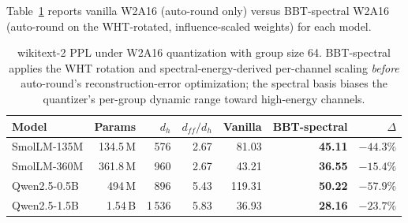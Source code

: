 \documentclass[11pt]{article}
\begin{document}
Table~\ref{tab:llm_quant} reports vanilla W2A16 (auto-round only) versus BBT-spectral W2A16 (auto-round on the WHT-rotated, influence-scaled weights) for each model.

\begin{table}[t]
\centering
\small
\caption{wikitext-2 PPL under W2A16 quantization with group size 64. BBT-spectral applies the WHT rotation and spectral-energy-derived per-channel scaling \emph{before} auto-round's reconstruction-error optimization; the spectral basis biases the quantizer's per-group dynamic range toward high-energy channels.}
\label{tab:llm_quant}
\begin{tabular}{lrrrrrr}
\toprule
\textbf{Model} & Params & $d_h$ & $d_{ff}/d_h$ & Vanilla & BBT-spectral & $\Delta$ \\
\midrule
SmolLM-135M & 134.5\,M & 576 & 2.67 & 81.03 & \textbf{45.11} & $-44.3\%$ \\
SmolLM-360M & 361.8\,M & 960 & 2.67 & 43.21 & \textbf{36.55} & $-15.4\%$ \\
Qwen2.5-0.5B & 494\,M & 896 & 5.43 & 119.31 & \textbf{50.22} & $\mathbf{-57.9\%}$ \\
Qwen2.5-1.5B & 1.54\,B & 1\,536 & 5.83 & 36.93 & \textbf{28.16} & $-23.7\%$ \\
\bottomrule
\end{tabular}
\end{table}
\end{document}
